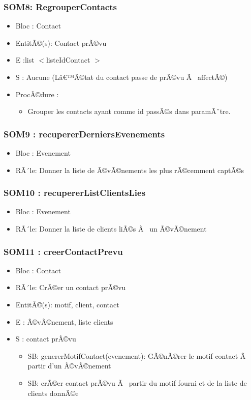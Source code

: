 \subsubsection{SOM8: RegrouperContacts}
\begin{itemize}
\item Bloc : Contact
\item EntitÃ©(s): Contact prÃ©vu
\item E :list $<$listeIdContact $>$\item S : Aucune (Lâ€™Ã©tat du contact passe de prÃ©vu Ã  affectÃ©)
\item ProcÃ©dure : 	
\begin{itemize}		
\item Grouper les contacts ayant comme id passÃ©s dans paramÃ¨tre.
\end{itemize}
\end{itemize}

\subsubsection{SOM9 : recupererDerniersEvenements}
\begin{itemize}
\item Bloc : Evenement
\item RÃ´le: Donner la liste de Ã©vÃ©nements les plus rÃ©cemment captÃ©s
\end{itemize}

\subsubsection{SOM10 : recupererListClientsLies}
\begin{itemize}
\item Bloc : Evenement
\item RÃ´le: Donner la liste de clients liÃ©s Ã  un Ã©vÃ©nement
\end{itemize}

\subsubsection{SOM11 : creerContactPrevu}
\begin{itemize}
\item Bloc : Contact
\item RÃ´le: CrÃ©er un contact prÃ©vu 
\item EntitÃ©(s): motif, client, contact
\item E :  Ã©vÃ©nement, liste clients
\item S : contact prÃ©vu
\begin{itemize}		
\item SB: genererMotifContact(evenement): GÃ©nÃ©rer le motif contact Ã  partir d'un Ã©vÃ©nement
\item SB: crÃ©er contact prÃ©vu Ã  partir du motif fourni et de la liste de clients donnÃ©e
\end{itemize}
\end{itemize}
